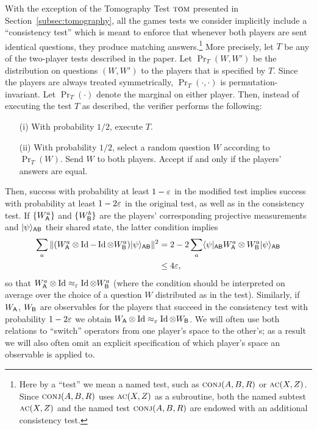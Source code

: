 With the exception of the Tomography Test $\textsc{tom}$ presented in Section~\ref{subsec:tomography}, 
all the games tests we consider implicitly include a ``consistency test'' which is meant to enforce that whenever both players are sent identical questions, they produce matching answers.\footnote{Here by a ``test'' we mean a named test, such as $\textsc{conj}(A,B,R)$ or $\textsc{ac}(X,Z)$. Since $\textsc{conj}(A,B,R)$ uses $\textsc{ac}(X,Z)$ as a subroutine, both the named subtest $\textsc{ac}(X,Z)$ and the named test $\textsc{conj}(A,B,R)$ are endowed with an additional consistency test.} More precisely, let $T$ be any of the two-player tests described in the paper. Let $\Pr_T(W,W')$ be the distribution on questions $(W,W')$ to the players that is specified by $T$. Since the players are always treated symmetrically, $\Pr_T(\cdot,\cdot)$ is permutation-invariant. Let $\Pr_T(\cdot)$ denote the marginal on either player. Then, instead of executing the test $T$ as described, the verifier performs the following: 
\begin{enumerate}
\item[(i)] With probability $1/2$, execute $T$.
\item[(ii)] With probability $1/2$, select a random question $W$ according to $\Pr_T(W)$. Send $W$ to both players. Accept if and only if the players' answers are equal. 
\end{enumerate}
Then, success with probability at least $1-\varepsilon$ in the modified test implies success with probability at least $1-2\varepsilon$ in the original test, as well as in the consistency test. If $\{W_{{\textsf{A}}}^a\}$ and $\{W_{{\textsf{B}}}^b\}$ are the players' corresponding projective measurements and $|\psi\rangle_{{\textsf{AB}}}$ their shared state, the latter condition implies 
\begin{align}
\sum_a \|(W_{{\textsf{A}}}^a \otimes \mathop{\rm Id}\nolimits - \mathop{\rm Id}\nolimits \otimes W_{{\textsf{B}}}^a)|\psi\rangle_{{\textsf{AB}}}\|^2 &= 2-2 \sum_a \langle\psi|_{{\textsf{AB}}} W_{{\textsf{A}}}^a \otimes W_{{\textsf{B}}}^a |\psi\rangle_{{\textsf{AB}}} \notag\\ 
&\leq 4 \varepsilon,\label{eq:consistency}
\end{align}
so that $W_{{\textsf{A}}}^a \otimes \mathop{\rm Id}\nolimits \approx_{\varepsilon} \mathop{\rm Id}\nolimits \otimes
W_{{\textsf{B}}}^a$ (where the condition should be interpreted on average over the
choice of a question $W$ distributed as in the test). Similarly, if
$W_{{\textsf{A}}}$, $W_{{\textsf{B}}}$ are observables for the players that succeed in the
consistency test with probability $1-2\varepsilon$ we obtain $W_{{\textsf{A}}}\otimes \mathop{\rm Id}\nolimits
\approx_{\varepsilon} \mathop{\rm Id}\nolimits \otimes W_{{\textsf{B}}}$. We will often use both relations to ``switch'' operators from one player's space to the other's; as a result we will also often omit an explicit specification of which player's space an observable is applied to. 


